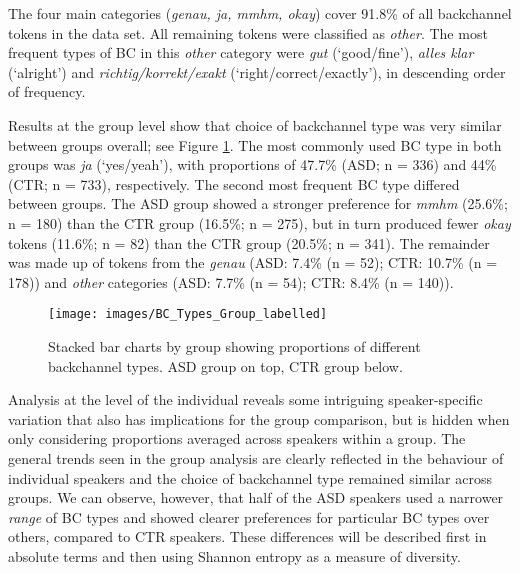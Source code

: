The four main categories (\emph{genau, ja, mmhm, okay}) cover 91.8\% of all backchannel tokens in the data set. All remaining tokens were classified as \emph{other}. The most frequent types of BC in this \emph{other} category were \emph{gut} (`good/fine'), \emph{alles klar} (`alright') and \emph{richtig/korrekt/exakt} (`right/correct/exactly'), in descending order of frequency.

Results at the group level show that choice of backchannel type was very similar between groups overall; see Figure \ref{fig:BCTypeGroupPic}. The most commonly used BC type in both groups was \emph{ja} (`yes/yeah'), with proportions of 47.7\% (ASD; n = 336) and 44\% (CTR; n = 733), respectively. The second most frequent BC type differed between groups. The ASD group showed a stronger preference for \emph{mmhm} (25.6\%; n = 180) than the CTR group (16.5\%; n = 275), but in turn produced fewer \emph{okay} tokens  (11.6\%; n = 82) than the CTR group (20.5\%; n = 341).  The remainder was made up of tokens from the \emph{genau} (ASD: 7.4\% (n = 52); CTR: 10.7\% (n = 178)) and \emph{other} categories (ASD: 7.7\% (n = 54); CTR: 8.4\% (n = 140)).



\begin{figure}

\texttt{[image: images/BC\_Types\_Group\_labelled]} \hfill{}

\caption{Stacked bar charts by group showing proportions of different backchannel types. ASD group on top, CTR group below.}\label{fig:BCTypeGroupPic}
\end{figure}

Analysis at the level of the individual reveals some intriguing speaker-specific variation that also has implications for the group comparison, but is hidden when only considering proportions averaged across speakers within a group. The general trends seen in the group analysis are clearly reflected in the behaviour of individual speakers and the choice of backchannel type remained similar across groups. We can observe, however, that half of the ASD speakers used a narrower \emph{range} of BC types and showed clearer preferences for particular BC types over others, compared to CTR speakers. These differences will be described first in absolute terms and then using Shannon entropy as a measure of diversity.

